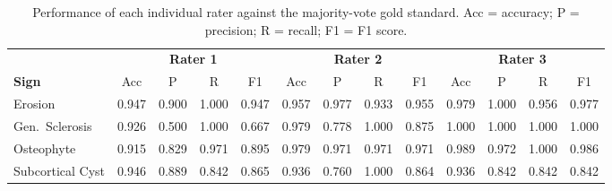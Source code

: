 \documentclass[review,12pt]{elsarticle}
\begin{document}
\begin{table}[htbp]
\centering
\caption{Performance of each individual rater against the majority-vote
gold standard. Acc = accuracy; P = precision; R = recall; F1 = F1 score.}
\label{tab:rater_vs_gold}
\small
\setlength{\tabcolsep}{4pt}
\begin{tabular}{lcccccccccccc}
\toprule
& \multicolumn{4}{c}{\textbf{Rater 1}} &
  \multicolumn{4}{c}{\textbf{Rater 2}} &
  \multicolumn{4}{c}{\textbf{Rater 3}} \\
\cmidrule(lr){2-5}\cmidrule(lr){6-9}\cmidrule(lr){10-13}
\textbf{Sign} & Acc & P & R & F1 & Acc & P & R & F1 & Acc & P & R & F1 \\
\midrule
Erosion
  & 0.947 & 0.900 & 1.000 & 0.947
  & 0.957 & 0.977 & 0.933 & 0.955
  & 0.979 & 1.000 & 0.956 & 0.977 \\
Gen.\ Sclerosis
  & 0.926 & 0.500 & 1.000 & 0.667
  & 0.979 & 0.778 & 1.000 & 0.875
  & 1.000 & 1.000 & 1.000 & 1.000 \\
Osteophyte
  & 0.915 & 0.829 & 0.971 & 0.895
  & 0.979 & 0.971 & 0.971 & 0.971
  & 0.989 & 0.972 & 1.000 & 0.986 \\
Subcortical Cyst
  & 0.946 & 0.889 & 0.842 & 0.865
  & 0.936 & 0.760 & 1.000 & 0.864
  & 0.936 & 0.842 & 0.842 & 0.842 \\
\bottomrule
\end{tabular}
\end{table}
\end{document}

